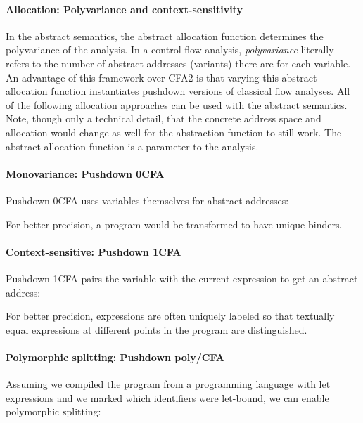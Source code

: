 \paragraph{Allocation: Polyvariance and context-sensitivity}
\label{sec:polyvariance}
In the abstract semantics, the abstract allocation function
 determines the
polyvariance of the analysis.
In a control-flow analysis, \emph{polyvariance} literally refers to
the number of abstract addresses (variants) there are for each
variable.
An advantage of this framework over CFA2 is
that varying this abstract allocation function
instantiates pushdown versions of classical flow analyses.
All of the following allocation approaches can be used with the
abstract semantics. Note, though only a technical detail, that the concrete address space and allocation would change as well for the abstraction function to still work.
The abstract allocation function is a
parameter to the analysis.

\paragraph{Monovariance: Pushdown 0CFA}

Pushdown 0CFA uses variables themselves for abstract addresses:



For better precision, a program would be transformed to have unique binders.

  \paragraph{Context-sensitive: Pushdown 1CFA}

  Pushdown 1CFA pairs the variable with the current expression to get
  an abstract address:

  

  For better precision, expressions are often uniquely labeled so that textually equal expressions at different points in the program are distinguished.

    \paragraph{Polymorphic splitting: Pushdown poly/CFA}

    Assuming we compiled the program from a programming language with
    let expressions and we marked which identifiers were let-bound, we
    can enable polymorphic splitting:

    


